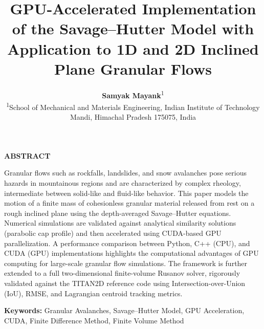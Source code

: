 \documentclass[10pt, conference]{FMFP2023}
\begin{document}
\title{\Large\textbf{GPU-Accelerated Implementation of the
Savage--Hutter Model with Application to 1D and 2D Inclined Plane
Granular Flows}}

\author{\textbf{Samyak Mayank}\textsuperscript{1}\\
\textsuperscript{1}\small{School of Mechanical and Materials
Engineering, Indian Institute of Technology Mandi,
Himachal Pradesh 175075, India}}

\maketitle
\thispagestyle{fancy}
\pagestyle{plain}

\noindent\textbf{ABSTRACT}

\noindent
Granular flows such as rockfalls, landslides, and snow avalanches pose
serious hazards in mountainous regions and are characterized by complex
rheology, intermediate between solid-like and fluid-like behavior.
This paper models the motion of a finite mass of cohesionless granular
material released from rest on a rough inclined plane using the
depth-averaged Savage--Hutter equations.
Numerical simulations are validated against analytical similarity
solutions (parabolic cap profile) and then accelerated using CUDA-based
GPU parallelization.
A performance comparison between Python, C++ (CPU), and CUDA (GPU)
implementations highlights the computational advantages of GPU computing
for large-scale granular flow simulations.
The framework is further extended to a full two-dimensional
finite-volume Rusanov solver, rigorously validated against the TITAN2D
reference code using Intersection-over-Union (IoU), RMSE, and
Lagrangian centroid tracking metrics.

\smallskip
\noindent\textbf{Keywords:} Granular Avalanches, Savage--Hutter Model,
GPU Acceleration, CUDA, Finite Difference Method, Finite Volume Method

\end{document}
